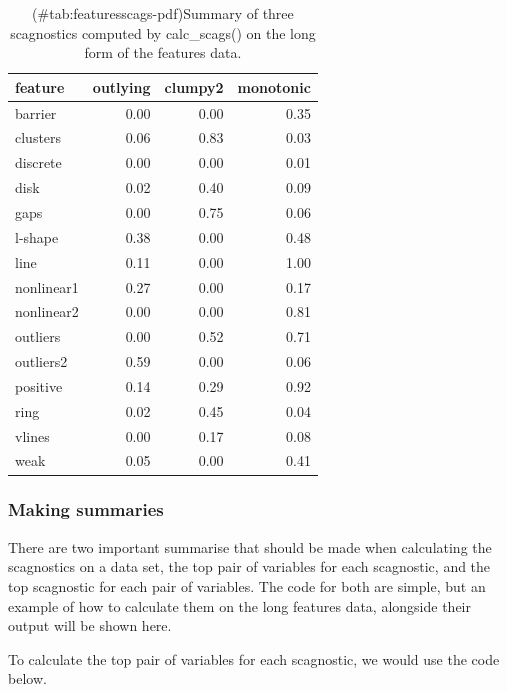 \begin{Schunk}
\begin{table}

\caption{(\#tab:featuresscags-pdf)Summary of three scagnostics computed by calc\_scags() on the long form of the features data.}
\centering
\begin{tabular}[t]{>{\raggedright\arraybackslash}p{3cm}rrr}
\toprule
feature & outlying & clumpy2 & monotonic\\
\midrule
barrier & 0.00 & 0.00 & 0.35\\
clusters & 0.06 & 0.83 & 0.03\\
discrete & 0.00 & 0.00 & 0.01\\
disk & 0.02 & 0.40 & 0.09\\
gaps & 0.00 & 0.75 & 0.06\\
\addlinespace
l-shape & 0.38 & 0.00 & 0.48\\
line & 0.11 & 0.00 & 1.00\\
nonlinear1 & 0.27 & 0.00 & 0.17\\
nonlinear2 & 0.00 & 0.00 & 0.81\\
outliers & 0.00 & 0.52 & 0.71\\
\addlinespace
outliers2 & 0.59 & 0.00 & 0.06\\
positive & 0.14 & 0.29 & 0.92\\
ring & 0.02 & 0.45 & 0.04\\
vlines & 0.00 & 0.17 & 0.08\\
weak & 0.05 & 0.00 & 0.41\\
\bottomrule
\end{tabular}
\end{table}

\end{Schunk}

\hypertarget{making-summaries}{%
\subsubsection{Making summaries}\label{making-summaries}}

There are two important summarise that should be made when calculating
the scagnostics on a data set, the top pair of variables for each
scagnostic, and the top scagnostic for each pair of variables. The code
for both are simple, but an example of how to calculate them on the long
features data, alongside their output will be shown here.

To calculate the top pair of variables for each scagnostic, we would use
the code below.

